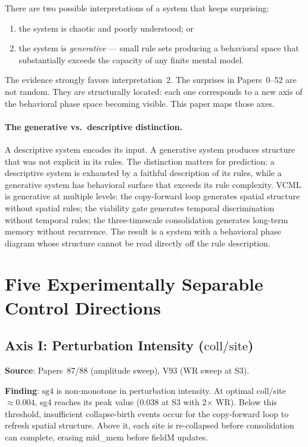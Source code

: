 \documentclass[11pt,a4paper]{article}
\begin{document}
There are two possible interpretations of a system that keeps surprising:
\begin{enumerate}
  \item the system is chaotic and poorly understood; or
  \item the system is \emph{generative} --- small rule sets producing a
    behavioral space that substantially exceeds the capacity of any finite
    mental model.
\end{enumerate}

The evidence strongly favors interpretation~2.
The surprises in Papers~0--52 are not random.
They are structurally located: each one corresponds to a new axis of the
behavioral phase space becoming visible.
This paper maps those axes.

\paragraph{The generative vs.\ descriptive distinction.}
A descriptive system encodes its input.
A generative system produces structure that was not explicit in its rules.
The distinction matters for prediction: a descriptive system is exhausted
by a faithful description of its rules, while a generative system has
behavioral surface that exceeds its rule complexity.
VCML is generative at multiple levels:
the copy-forward loop generates spatial structure without spatial rules;
the viability gate generates temporal discrimination without temporal rules;
the three-timescale consolidation generates long-term memory without
recurrence.
The result is a system with a behavioral phase diagram whose structure
cannot be read directly off the rule description.

\section{Five Experimentally Separable Control Directions}

\subsection{Axis I: Perturbation Intensity ($\mathrm{coll}/\mathrm{site}$)}

\textbf{Source}: Papers~87/88 (amplitude sweep), V93 (WR sweep at S3).

\textbf{Finding}: $\mathrm{sg4}$ is non-monotone in perturbation intensity.
At optimal coll/site~$\approx 0.004$, sg4 reaches its peak value (0.038 at
S3 with 2$\times$ WR).
Below this threshold, insufficient collapse-birth events occur for the
copy-forward loop to refresh spatial structure.
Above it, each site is re-collapsed before consolidation can complete,
erasing mid\_mem before fieldM updates.
\end{document}
